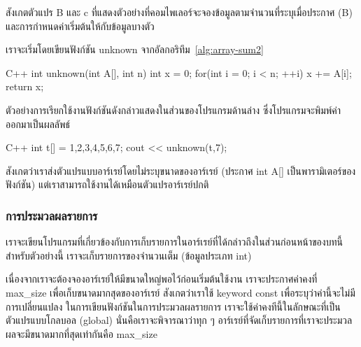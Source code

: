 สังเกต{\wbr}ตัวแปร {\ct B} และ {\ct c}
ที่{\wbr}แสดง{\wbr}ตัวอย่าง{\wbr}ที่{\wbr}คอมไพเลอร์{\wbr}จะ{\wbr}จอง{\wbr}ข้อมูล{\wbr}ตาม{\wbr}จำนวน{\wbr}ที่{\wbr}ระบุ{\wbr}เมื่อ{\wbr}ประกาศ ({\ct B})
และ{\wbr}การ{\wbr}กำหนด{\wbr}ค่า{\wbr}เริ่มต้น{\wbr}ให้{\wbr}กับ{\wbr}ข้อมูล{\wbr}บาง{\wbr}ตัว{\wbr}

เรา{\wbr}จะ{\wbr}เริ่ม{\wbr}โดย{\wbr}เขียน{\wbr}ฟังก์ชัน {\ct unknown} จาก{\wbr}อัลกอริทึม~\ref{alg:array-sum2}

\latintext
\begin{codelist}{C++}{}
int unknown(int A[], int n)
{
  int x = 0;
  for(int i = 0; i < n; ++i)
    x += A[i];
  return x;
}
\end{codelist}
\thaitext

ตัวอย่าง{\wbr}การ{\wbr}เรียก{\wbr}ใช้งาน{\wbr}ฟังก์ชัน{\wbr}ดัง{\wbr}กล่าว{\wbr}แสดง{\wbr}ใน{\wbr}ส่วน{\wbr}ของ{\wbr}โปรแกรม{\wbr}ด้าน{\wbr}ล่าง{\wbr}
ซึ่ง{\wbr}โปรแกรม{\wbr}จะ{\wbr}พิมพ์{\wbr}ค่า {} ออก{\wbr}มา{\wbr}เป็น{\wbr}ผลลัพธ์{\wbr}

\latintext
\begin{codelist}{C++}{}
  int t[] = {1,2,3,4,5,6,7};
  cout << unknown(t,7);
\end{codelist}
\thaitext
 
สังเกต{\wbr}ว่า{\wbr}เรา{\wbr}ส่ง{\wbr}ตัวแปร{\wbr}แบบ{\wbr}อาร์{\wbr}เรย์{\wbr}โดย{\wbr}ไม่{\wbr}ระบุ{\wbr}ขนาด{\wbr}ของ{\wbr}อาร์{\wbr}เรย์ (ประกาศ {\ct int A[]}
เป็น{\wbr}พารามิเตอร์{\wbr}ของ{\wbr}ฟังก์ชัน) แต่{\wbr}เรา{\wbr}สามารถ{\wbr}ใช้งาน{\wbr}ได้{\wbr}เหมือน{\wbr}ตัวแปร{\wbr}อาร์{\wbr}เรย์{\wbr}ปกติ{\wbr}

\subsubsection{การ{\wbr}ประมวล{\wbr}ผล{\wbr}รายการ}

เรา{\wbr}จะ{\wbr}เขียน{\wbr}โปรแกรม{\wbr}ที่{\wbr}เกี่ยวข้อง{\wbr}กับ{\wbr}การ{\wbr}เก็บ{\wbr}รายการ{\wbr}ใน{\wbr}อาร์{\wbr}เรย์{\wbr}ที่{\wbr}ได้{\wbr}กล่าว{\wbr}ถึง{\wbr}ใน{\wbr}ส่วน{\wbr}ก่อนหน้า{\wbr}ของ{\wbr}บท{\wbr}นี้{\wbr}
สำหรับ{\wbr}ตัวอย่าง{\wbr}นี้ เรา{\wbr}จะ{\wbr}เก็บ{\wbr}รายการ{\wbr}ของ{\wbr}จำนวน{\wbr}เต็ม (ข้อมูล{\wbr}ประเภท {\ct int})

เนื่อง{\wbr}จาก{\wbr}เรา{\wbr}จะ{\wbr}ต้อง{\wbr}จอง{\wbr}อาร์{\wbr}เรย์{\wbr}ให้{\wbr}มี{\wbr}ขนาด{\wbr}ใหญ่{\wbr}พอ{\wbr}ไว้{\wbr}ก่อน{\wbr}เริ่มต้น{\wbr}ใช้งาน เรา{\wbr}จะ{\wbr}ประกาศ{\wbr}ค่า{\wbr}คงที่{\wbr}
{\ct max\_size} เพื่อ{\wbr}เก็บ{\wbr}ขนาด{\wbr}มาก{\wbr}สุด{\wbr}ของ{\wbr}อาร์{\wbr}เรย์ สังเกต{\wbr}ว่า{\wbr}เรา{\wbr}ใช้ keyword {\ct
  const} เพื่อ{\wbr}ระบุ{\wbr}ว่า{\wbr}ค่า{\wbr}นี้{\wbr}จะ{\wbr}ไม่{\wbr}มี{\wbr}การ{\wbr}เปลี่ยนแปลง{\wbr}
ใน{\wbr}การ{\wbr}เขียน{\wbr}ฟังก์ชัน{\wbr}ใน{\wbr}การ{\wbr}ประมวล{\wbr}ผล{\wbr}รายการ{\wbr}
เรา{\wbr}จะ{\wbr}ใช้{\wbr}ค่า{\wbr}คง{\wbr}ทีนี้{\wbr}ใน{\wbr}ลักษณะ{\wbr}ที่{\wbr}เป็น{\wbr}ตัวแปร{\wbr}แบบ{\wbr}โกลบอล (global) นั่น{\wbr}คือ{\wbr}เรา{\wbr}จะ{\wbr}พิจารณา{\wbr}ว่า{\wbr}ทุก ๆ
อาร์{\wbr}เรย์{\wbr}ที่{\wbr}จัด{\wbr}เก็บ{\wbr}รายการ{\wbr}ที่{\wbr}เรา{\wbr}จะ{\wbr}ประมวล{\wbr}ผล{\wbr}จะ{\wbr}มี{\wbr}ขนาด{\wbr}มาก{\wbr}ที่สุด{\wbr}เท่า{\wbr}กัน{\wbr}คือ {\ct max\_size}


